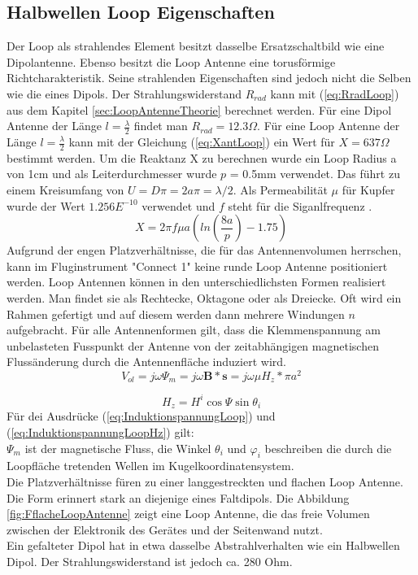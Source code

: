 \subsection{Halbwellen Loop Eigenschaften}
Der Loop als strahlendes Element besitzt dasselbe Ersatzschaltbild wie eine Dipolantenne. Ebenso besitzt die Loop Antenne eine torusförmige Richtcharakteristik. Seine strahlenden Eigenschaften sind jedoch nicht die Selben wie die eines Dipols. Der Strahlungswiderstand $R_{rad}$ kann mit (\ref{eq:RradLoop}) aus dem Kapitel \ref{sec:LoopAntenneTheorie} berechnet werden. Für eine Dipol Antenne der Länge $l=\frac{\lambda}{2}$ findet man $R_{rad} = 12.3\Omega$. Für eine Loop Antenne der Länge $l=\frac{\lambda}{2}$ kann mit der Gleichung (\ref{eq:XantLoop}) ein Wert für $X = 637 \Omega$ bestimmt werden. Um die Reaktanz X zu berechnen wurde ein Loop Radius a von 1cm und als Leiterdurchmesser wurde $p$ = 0.5mm verwendet. Das führt zu einem Kreisumfang von $U=D\pi=2a\pi=\lambda /2$. Als Permeabilität $\mu $ für Kupfer wurde der Wert $1.256E^{-10}$ verwendet und $f$ steht für die Siganlfrequenz \cite{Antenne_Theory_Xant_Loop}.
\begin{equation}\label{eq:XantLoop}
X= 2\pi f\mu a(ln \left( \frac{8a}{p} \right) - 1.75)
\end{equation}
Aufgrund der engen Platzverhältnisse, die für das Antennenvolumen herrschen, kann im Fluginstrument "Connect 1" keine runde Loop Antenne positioniert werden. Loop Antennen können in den unterschiedlichsten Formen realisiert werden. Man findet sie als Rechtecke, Oktagone oder als Dreiecke. Oft wird ein Rahmen gefertigt und auf diesem werden dann mehrere Windungen $n$ aufgebracht. Für alle Antennenformen gilt, dass die Klemmenspannung am unbelasteten Fusspunkt der Antenne von der zeitabhängigen magnetischen Flussänderung durch die Antennenfläche induziert wird.
\begin{equation}\label{eq:InduktionspannungLoop}
V_{ol}= j\omega\Psi_{m}=j\omega\textbf{B}*\textbf{s}= j\omega\mu H_{z}*\pi a^{2}
\end{equation}

\begin{equation}\label{eq:InduktionspannungLoopHz}
H_{z}=H^{i}\cos\Psi\sin\theta_{i}
\end{equation}
Für dei Ausdrücke  (\ref{eq:InduktionspannungLoop}) und (\ref{eq:InduktionspannungLoopHz}) gilt: \\
$\Psi_{m}$ ist der magnetische Fluss, die Winkel $\theta_{i}$ und $\varphi_{i}$ beschreiben die durch die Loopfläche tretenden Wellen im  Kugelkoordinatensystem.\\ 
Die Platzverhältnisse füren zu einer langgestreckten und flachen Loop Antenne. Die Form erinnert stark an diejenige eines Faltdipols. Die Abbildung \ref{fig:FflacheLoopAntenne} zeigt eine Loop Antenne, die das freie Volumen zwischen der Elektronik des Gerätes und der Seitenwand nutzt.\\
Ein gefalteter Dipol hat in etwa dasselbe Abstrahlverhalten wie ein Halbwellen Dipol. Der Strahlungswiderstand ist jedoch ca. 280 Ohm. 

